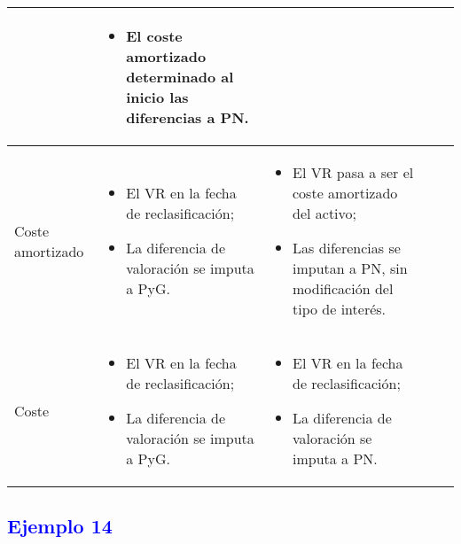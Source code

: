 \begin{table}[H]
{\begin{scriptsize}
\begin{tabularx}{\textwidth}{|X|X|X|X|X|}
\begin{itemize}
        \end{itemize} & 
        \begin{itemize}
            \item El coste amortizado determinado al inicio las diferencias a PN.
        \end{itemize} & \hspace{1pt} \\
        \hline
        Coste amortizado & 
        \begin{itemize}
            \item El VR en la fecha de reclasificación;
            \item La diferencia de valoración se imputa a PyG.
        \end{itemize} & 
        \begin{itemize}
            \item El VR pasa a ser el coste amortizado del activo;
            \item Las diferencias se imputan a PN, sin modificación del tipo de interés.
        \end{itemize} & \hspace{1pt} & \hspace{1pt} \\
        \hline
        Coste & 
        \begin{itemize}
            \item El VR en la fecha de reclasificación;
            \item La diferencia de valoración se imputa a PyG.
        \end{itemize} & 
        \begin{itemize}
            \item El VR en la fecha de reclasificación;
            \item La diferencia de valoración se imputa a PN.
        \end{itemize} & \hspace{1pt} & \hspace{1pt} \\
        \hline
    \end{tabularx}
    \end{scriptsize}
    } %
    \label{tab:ReclasificacionAF}
\end{table}

\subsection*{\textcolor{blue}{Ejemplo 14}}

